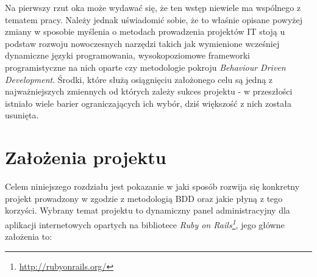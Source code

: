   Na pierwszy rzut oka może wydawać się, że ten wstęp niewiele ma wspólnego z tematem pracy. Należy jednak uświadomić sobie, że to właśnie opisane powyżej zmiany w sposobie myślenia o metodach prowadzenia projektów IT stoją u podstaw rozwoju nowoczesnych narzędzi takich jak wymienione wcześniej dynamiczne języki programowania, wysokopoziomowe frameworki programistyczne na nich oparte czy metodologie pokroju \emph{Behaviour Driven Development}. Środki, które służą osiągnięciu założonego celu są jedną z najważniejszych zmiennych od których zależy sukces projektu - w przeszłości istniało wiele barier ograniczających ich wybór, dziś większość z nich została usunięta.
  
  \section{Założenia projektu}
  Celem niniejszego rozdziału jest pokazanie w jaki sposób rozwija się konkretny projekt prowadzony w zgodzie z metodologią BDD oraz jakie płyną z tego korzyści. Wybrany temat projektu to dynamiczny panel administracyjny dla aplikacji internetowych opartych na bibliotece \emph{Ruby on Rails\footnote{\url{http://rubyonrails.org/}}}, jego główne założenia to:
  
